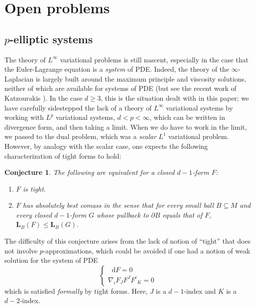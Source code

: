 \documentclass[reqno,11pt]{amsart}
\newcommand*\dif{\mathop{}\!\mathrm{d}}
\newcommand{\Comass}{\mathbf L}
\newcommand{\dfn}[1]{\emph{#1}\index{#1}}
\newtheorem{conjecture}[theorem]{Conjecture}
\theoremstyle{definition}
\numberwithin{equation}{section}
\begin{document}
\section{Open problems}
\subsection{\texorpdfstring{$p$-elliptic systems}{p-elliptic systems}}
The theory of $L^\infty$ variational problems is still nascent, especially in the case that the Euler-Lagrange equation is a \emph{system} of PDE.
Indeed, the theory of the $\infty$-Laplacian is largely built around the maximum principle and viscosity solutions, neither of which are available for systems of PDE (but see the recent work of Katzourakis \cite{Katzourakis2018OnAV}).
In the case $d \geq 3$, this is the situation dealt with in this paper; we have carefully sidestepped the lack of a theory of $L^\infty$ variational systems by working with $L^p$ variational systems, $d < p < \infty$, which can be written in divergence form, and then taking a limit.
When we do have to work in the limit, we passed to the dual problem, which was a \emph{scalar} $L^1$ variational problem.
However, by analogy with the scalar case, one expects the following characterization of tight forms to hold:

\begin{conjecture}
The following are equivalent for a closed $d - 1$-form $F$:
\begin{enumerate}
\item $F$ is tight.
\item $F$ has \dfn{absolutely best comass} in the sense that for every small ball $B \subseteq M$ and every closed $d - 1$-form $G$ whose pullback to $\partial B$ equals that of $F$, $\Comass_B(F) \leq \Comass_B(G)$.
\end{enumerate}
\end{conjecture}

The difficulty of this conjecture arises from the lack of notion of ``tight'' that does not involve $p$-approximations, which could be avoided if one had a notion of weak solution for the system of PDE 
\begin{equation}\label{infinity Maxwell}
\begin{cases}
\dif F = 0\\
\nabla_i F_J F^J {F^i}_K = 0
\end{cases}
\end{equation}
which is satisfied \emph{formally} by tight forms.
Here, $J$ is a $d - 1$-index and $K$ is a $d - 2$-index.
\end{document}
